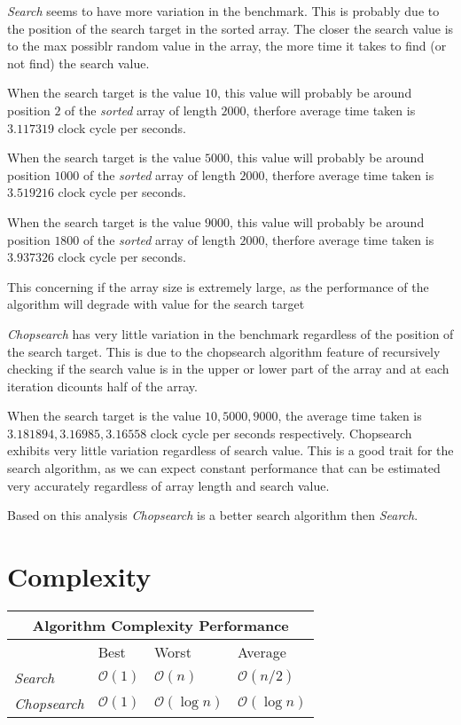 \documentclass[a4paper]{article}
\begin{document}
\textit{Search} seems to have more variation in the benchmark. This is probably due to the position of the search target in the sorted array. The closer the search value is to the max possiblr random value in the array, 
the more time it takes to find (or not find) the search value.

When the search target is the value $10$, this value will probably be around position $2$ of the \textit{sorted} array of length $2000$, therfore average time taken is $3.117319$ clock cycle per seconds.

When the search target is the value $5000$, this value will probably be around position $1000$ of the \textit{sorted} array of length $2000$, therfore average time taken is $3.519216$ clock cycle per seconds.

When the search target is the value $9000$, this value will probably be around position $1800$ of the \textit{sorted} array of length $2000$, therfore average time taken is $3.937326$ clock cycle per seconds.

This concerning if the array size is extremely large, as the performance of the algorithm will degrade with value for the search target

\vspace{5mm}

\textit{Chopsearch} has very little variation in the benchmark regardless of the position of the search target. This is due to the chopsearch algorithm feature of recursively checking if the search value is in the upper or lower 
part of the array and at each iteration dicounts half of the array.

When the search target is the value $10, 5000, 9000$, the average time taken is $3.181894, 3.16985, 3.16558$ clock cycle per seconds respectively. Chopsearch exhibits very little variation regardless of search value. This is a good trait 
for the search algorithm, as we can expect constant performance that can be estimated very accurately regardless of array length and search value.

Based on this analysis \textit{Chopsearch} is a better search algorithm then \textit{Search}.

\section{Complexity}

\begin{tabular}{|l|l|l|l|}
\hline
\multicolumn{4}{|c|}{Algorithm Complexity Performance} \\
\hline
 & Best & Worst & Average \\ \hline
\textit{Search} & $\mathcal{O}(1)$ & $\mathcal{O}(n)$ & $\mathcal{O}(n/2)$ \\
\textit{Chopsearch} & $\mathcal{O}(1)$ & $\mathcal{O}(\log{n})$ & $\mathcal{O}(\log{n})$ \\
\hline
\end{tabular}
\end{document}
